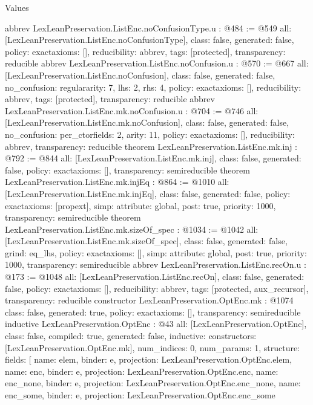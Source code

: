 \begin{lexlean}{Values}
\begin{coremodule}
{}
abbrev LexLeanPreservation.ListEnc.noConfusionType.{u} : @484 := @549 {
  all: [LexLeanPreservation.ListEnc.noConfusionType],
  class: false,
  generated: false,
  policy: exact{axioms: []},
  reducibility: abbrev{},
  tags: [protected],
  transparency: reducible
}
abbrev LexLeanPreservation.ListEnc.noConfusion.{u} : @570 := @667 {
  all: [LexLeanPreservation.ListEnc.noConfusion],
  class: false,
  generated: false,
  no_confusion: regular{arity: 7, lhs: 2, rhs: 4},
  policy: exact{axioms: []},
  reducibility: abbrev{},
  tags: [protected],
  transparency: reducible
}
abbrev LexLeanPreservation.ListEnc.mk.noConfusion.{u} : @704 := @746 {
  all: [LexLeanPreservation.ListEnc.mk.noConfusion],
  class: false,
  generated: false,
  no_confusion: per_ctor{fields: 2, arity: 11},
  policy: exact{axioms: []},
  reducibility: abbrev{},
  transparency: reducible
}
theorem LexLeanPreservation.ListEnc.mk.inj : @792 := @844 {
  all: [LexLeanPreservation.ListEnc.mk.inj],
  class: false,
  generated: false,
  policy: exact{axioms: []},
  transparency: semireducible
}
theorem LexLeanPreservation.ListEnc.mk.injEq : @864 := @1010 {
  all: [LexLeanPreservation.ListEnc.mk.injEq],
  class: false,
  generated: false,
  policy: exact{axioms: [propext]},
  simp: {attribute: global, post: true, priority: 1000},
  transparency: semireducible
}
theorem LexLeanPreservation.ListEnc.mk.sizeOf_spec : @1034 := @1042 {
  all: [LexLeanPreservation.ListEnc.mk.sizeOf_spec],
  class: false,
  generated: false,
  grind: eq_lhs,
  policy: exact{axioms: []},
  simp: {attribute: global, post: true, priority: 1000},
  transparency: semireducible
}
abbrev LexLeanPreservation.ListEnc.recOn.{u} : @173 := @1048 {
  all: [LexLeanPreservation.ListEnc.recOn],
  class: false,
  generated: false,
  policy: exact{axioms: []},
  reducibility: abbrev{},
  tags: [protected, aux_recursor],
  transparency: reducible
}
constructor LexLeanPreservation.OptEnc.mk : @1074 {
  class: false,
  generated: true,
  policy: exact{axioms: []},
  transparency: semireducible
}
inductive LexLeanPreservation.OptEnc : @43 {
  all: [LexLeanPreservation.OptEnc],
  class: false,
  compiled: true,
  generated: false,
  inductive: {
    constructors: [LexLeanPreservation.OptEnc.mk],
    num_indices: 0,
    num_params: 1,
    structure: {
      fields: [
        {name: elem, binder: e, projection: LexLeanPreservation.OptEnc.elem},
        {name: enc, binder: e, projection: LexLeanPreservation.OptEnc.enc},
        {name: enc_none, binder: e, projection: LexLeanPreservation.OptEnc.enc_none},
        {name: enc_some, binder: e, projection: LexLeanPreservation.OptEnc.enc_some}
}}}
\end{coremodule}
\end{lexlean}
